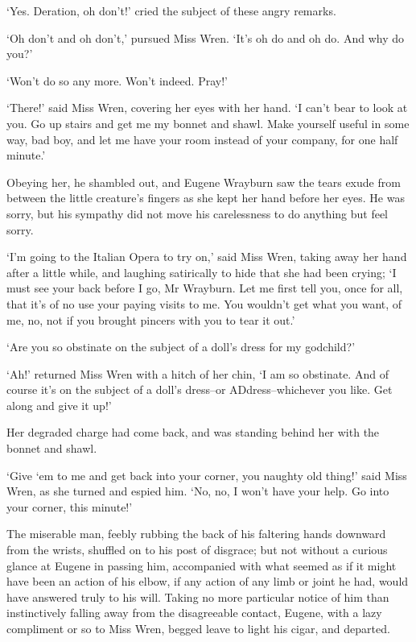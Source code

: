 ‘Yes. Deration, oh don’t!’ cried the subject of these angry remarks.

‘Oh don’t and oh don’t,’ pursued Miss Wren. ‘It’s oh do and oh do. And
why do you?’

‘Won’t do so any more. Won’t indeed. Pray!’

‘There!’ said Miss Wren, covering her eyes with her hand. ‘I can’t
bear to look at you. Go up stairs and get me my bonnet and shawl. Make
yourself useful in some way, bad boy, and let me have your room instead
of your company, for one half minute.’

Obeying her, he shambled out, and Eugene Wrayburn saw the tears exude
from between the little creature’s fingers as she kept her hand before
her eyes. He was sorry, but his sympathy did not move his carelessness
to do anything but feel sorry.

‘I’m going to the Italian Opera to try on,’ said Miss Wren, taking away
her hand after a little while, and laughing satirically to hide that she
had been crying; ‘I must see your back before I go, Mr Wrayburn. Let me
first tell you, once for all, that it’s of no use your paying visits
to me. You wouldn’t get what you want, of me, no, not if you brought
pincers with you to tear it out.’

‘Are you so obstinate on the subject of a doll’s dress for my godchild?’

‘Ah!’ returned Miss Wren with a hitch of her chin, ‘I am so
obstinate. And of course it’s on the subject of a doll’s dress--or
ADdress--whichever you like. Get along and give it up!’

Her degraded charge had come back, and was standing behind her with the
bonnet and shawl.

‘Give ‘em to me and get back into your corner, you naughty old thing!’
said Miss Wren, as she turned and espied him. ‘No, no, I won’t have your
help. Go into your corner, this minute!’

The miserable man, feebly rubbing the back of his faltering hands
downward from the wrists, shuffled on to his post of disgrace; but not
without a curious glance at Eugene in passing him, accompanied with what
seemed as if it might have been an action of his elbow, if any action of
any limb or joint he had, would have answered truly to his will. Taking
no more particular notice of him than instinctively falling away from
the disagreeable contact, Eugene, with a lazy compliment or so to Miss
Wren, begged leave to light his cigar, and departed.

